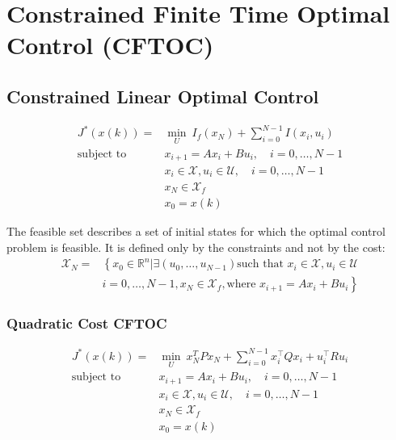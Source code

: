 \section{Constrained Finite Time Optimal Control (CFTOC)}
\subsection{Constrained Linear Optimal Control}
\noindent
\begin{align*}
    J^*(x(k)) =            & \min_U \: I_f(x_N) + \sum_{i=0}^{N-1}I(x_i,u_i)                    \\
    \text{subject to}\quad & x_{i+1} = Ax_i +Bu_i, \quad i = 0, \ldots, N-1                     \\
                           & x_i \in \mathcal{X}, u_i \in \mathcal{U}, \quad i = 0, \ldots, N-1 \\
                           & x_N \in \mathcal{X}_f                                              \\
                           & x_0 = x(k)
\end{align*}

The feasible set describes a set of initial states for which the optimal control problem is feasible. It is defined only by the constraints and not by the cost:
\begin{align*}
    \mathcal{X}_N = & \left\{ x_0 \in \mathbb{R}^n | \exists\left(u_0, \ldots, u_{N-1}\right) \text{such that } x_i\in\mathcal{X}, u_i\in\mathcal{U} \right. \\
                    & \left.i=0,\ldots, N-1, x_N\in\mathcal{X}_f, \text{where } x_{i+1}=Ax_i + Bu_i\right\}
\end{align*}

\subsubsection{Quadratic Cost CFTOC}
\noindent
\begin{align*}
    J^*(x(k)) =            & \min_U \: x_N^T P x_N + \sum_{i=0}^{N-1}x_i^\top Q x_i + u_i^\top R u_i \\
    \text{subject to}\quad & x_{i+1} = Ax_i +Bu_i, \quad i = 0, \ldots, N-1                          \\
                           & x_i \in \mathcal{X}, u_i \in \mathcal{U}, \quad i = 0, \ldots, N-1      \\
                           & x_N \in \mathcal{X}_f                                                   \\
                           & x_0 = x(k)
\end{align*}
